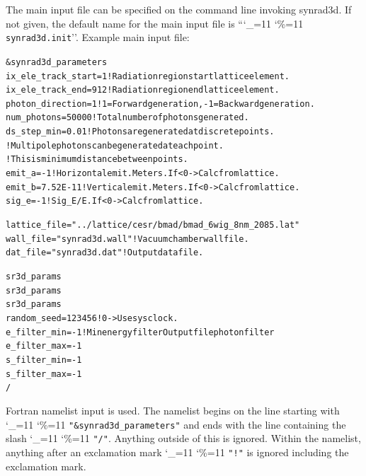 \documentclass[11pt]{article}
\newcommand\ttcmd{\begingroup\catcode`\_=11 \catcode`\%=11 \dottcmd}
\newcommand\dottcmd[1]{\texttt{#1}\endgroup}
\newcommand{\vn}{\ttcmd}
\newlength{\ExBeg}
\newlength{\ExEnd}
\newenvironment{example}
  {\vspace{\ExBeg} \begin{alltt}}
  {\end{alltt} \vspace{\ExEnd}}
\begin{document}
The main input file can be specified on the command line invoking synrad3d.
If not given, the default name for the main input file is ``\vn{synrad3d.init}''.
Example main input file:
\begin{example}
  &synrad3d_parameters
    ix_ele_track_start = 1    ! Radiation region start lattice element.
    ix_ele_track_end   = 912  ! Radiation region end lattice element.
    photon_direction = 1      ! 1 = Forward generation, -1 = Backward generation.
    num_photons      = 50000  ! Total number of photons generated. 
    ds_step_min      = 0.01   ! Photons are generated at discrete points. 
                              ! Multipole photons can be generated at each point.
                              ! This is minimum distance between points.
    emit_a       = -1         ! Horizontal emit. Meters. If < 0 -> Calc from lattice.
    emit_b       = 7.52E-11   ! Vertical emit.  Meters. If < 0 -> Calc from lattice.
    sig_e        = -1         ! Sig_E/E. If < 0 -> Calc from lattice.

    lattice_file = "../lattice/cesr/bmad/bmad_6wig_8nm_2085.lat" 
    wall_file    = "synrad3d.wall"     ! Vacuum chamber wall file.
    dat_file     = "synrad3d.dat"      ! Output data file.

    sr3d_params%
    sr3d_params%
    sr3d_params%
    random_seed = 123456                    ! 0 -> Use sys clock.
    e_filter_min = -1           ! Min energy filter Output file photon filter
    e_filter_max = -1
    s_filter_min = -1
    s_filter_max = -1
  /
\end{example}
Fortran namelist input is used.
The namelist begins on the line starting with \vn{"\&synrad3d_parameters"}
and ends with the line containing the slash \vn{"/"}. Anything outside
of this is ignored. Within the namelist, anything after an exclamation
mark \vn{"!"} is ignored including the exclamation mark. 
\end{document}
